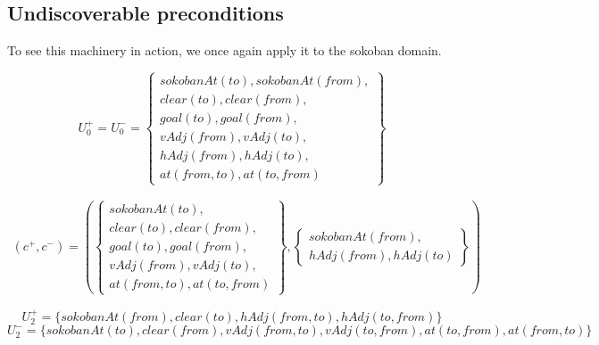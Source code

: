 \documentclass[../Master.tex]{subfiles}
\begin{document}
\subsection{Undiscoverable preconditions}

To see this machinery in action, we once again apply it to the sokoban domain.

\[
U_0^+ = U_0^- =
\left\{
    \begin{gathered}
        sokobanAt(to), sokobanAt(from), \\
        clear(to), clear(from), \\
        goal(to), goal(from), \\
        vAdj(from), vAdj(to), \\
        hAdj(from), hAdj(to), \\
        at(from, to), at(to, from)
    \end{gathered}
\right\}
\]

%

\begin{align}
(c^+, c^-) =
\left(
    \left\{
        \begin{gathered}
            sokobanAt(to), \\
            clear(to), clear(from), \\
            goal(to), goal(from), \\
            vAdj(from), vAdj(to), \\
            at(from, to), at(to, from)
        \end{gathered}
    \right\}
    ,
    \left\{
        \begin{gathered}
            sokobanAt(from), \\
            hAdj(from), hAdj(to)
        \end{gathered}
    \right\}
\right)
\end{align}


\[
U_2^+ = \{ sokobanAt(from), clear(to), hAdj(from, to), hAdj(to, from) \}
\]
\[
U_2^- = \{ sokobanAt(to), clear(from), vAdj(from, to), vAdj(to, from), at(to, from), at(from, to) \}
\]
\end{document}
